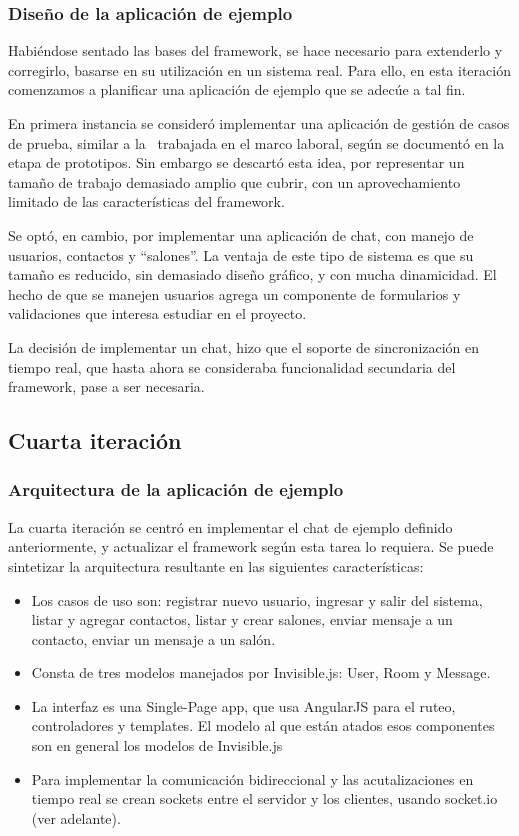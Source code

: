 \documentclass[doc,helv,longtable]{article}
\begin{document}
\subsubsection{Diseño de la aplicación de ejemplo}
Habiéndose sentado las bases del framework, se hace necesario para extenderlo y corregirlo, basarse en su utilización en un sistema real. Para ello, en esta iteración comenzamos a planificar una aplicación de ejemplo que se adecúe a tal fin.

En primera instancia se consideró implementar una aplicación de gestión de casos de prueba, similar a la  trabajada en el marco laboral, según se documentó en la etapa de prototipos. Sin embargo se descartó esta idea, por representar un tamaño de trabajo demasiado amplio que cubrir, con un aprovechamiento limitado de las características del framework.

Se optó, en cambio, por implementar una aplicación de chat, con manejo de usuarios, contactos y “salones”. La ventaja de este tipo de sistema es que su tamaño es reducido, sin demasiado diseño gráfico, y con mucha dinamicidad. El hecho de que se manejen usuarios agrega un componente de formularios y validaciones que interesa estudiar en el proyecto.

La decisión de implementar un chat, hizo que el soporte de sincronización en tiempo real, que hasta ahora se consideraba funcionalidad secundaria del framework, pase a ser necesaria.

\subsection{Cuarta iteración}
\subsubsection{Arquitectura de la aplicación de ejemplo}
La cuarta iteración se centró en implementar el chat de ejemplo definido anteriormente, y actualizar el framework según esta tarea lo requiera. Se puede sintetizar la arquitectura resultante en las siguientes características:
\begin{itemize}
\item  Los casos de uso son: registrar nuevo usuario, ingresar y salir del sistema, listar y agregar contactos, listar y crear salones, enviar mensaje a un contacto, enviar un mensaje a un salón.
\item  Consta de tres modelos manejados por Invisible.js: User, Room y Message.
\item  La interfaz es una Single-Page app, que usa AngularJS para el ruteo, controladores y templates. El modelo al que están atados esos componentes son en general los modelos de Invisible.js
\item  Para implementar la comunicación bidireccional y las acutalizaciones en tiempo real se crean sockets entre el servidor y los clientes, usando socket.io (ver adelante).

\end{itemize}
\end{document}
